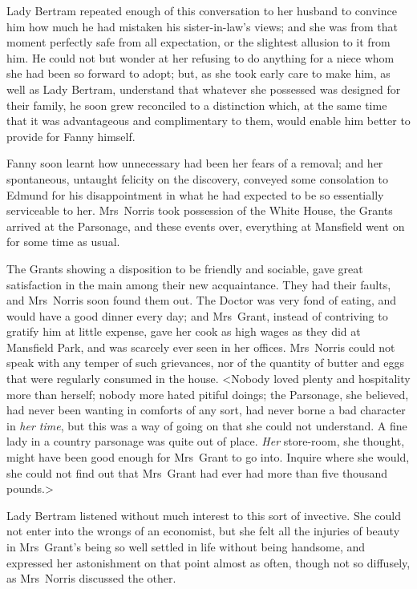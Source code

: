 Lady Bertram repeated enough of this conversation to her husband to convince him how much he had mistaken his sister-in-law's views; and she was from that moment perfectly safe from all expectation, or the slightest allusion to it from him. He could not but wonder at her refusing to do anything for a niece whom she had been so forward to adopt; but, as she took early care to make him, as well as Lady Bertram, understand that whatever she possessed was designed for their family, he soon grew reconciled to a distinction which, at the same time that it was advantageous and complimentary to them, would enable him better to provide for Fanny himself.

Fanny soon learnt how unnecessary had been her fears of a removal; and her spontaneous, untaught felicity on the discovery, conveyed some consolation to Edmund for his disappointment in what he had expected to be so essentially serviceable to her. Mrs~Norris took possession of the White House, the Grants arrived at the Parsonage, and these events over, everything at Mansfield went on for some time as usual.

The Grants showing a disposition to be friendly and sociable, gave great satisfaction in the main among their new acquaintance. They had their faults, and Mrs~Norris soon found them out. The Doctor was very fond of eating, and would have a good dinner every day; and Mrs~Grant, instead of contriving to gratify him at little expense, gave her cook as high wages as they did at Mansfield Park, and was scarcely ever seen in her offices. Mrs~Norris could not speak with any temper of such grievances, nor of the quantity of butter and eggs that were regularly consumed in the house. <Nobody loved plenty and hospitality more than herself; nobody more hated pitiful doings; the Parsonage, she believed, had never been wanting in comforts of any sort, had never borne a bad character in \textit{her time}, but this was a way of going on that she could not understand. A fine lady in a country parsonage was quite out of place. \textit{Her}  store-room, she thought, might have been good enough for Mrs~Grant to go into. Inquire where she would, she could not find out that Mrs~Grant had ever had more than five thousand pounds.>

Lady Bertram listened without much interest to this sort of invective. She could not enter into the wrongs of an economist, but she felt all the injuries of beauty in Mrs~Grant's being so well settled in life without being handsome, and expressed her astonishment on that point almost as often, though not so diffusely, as Mrs~Norris discussed the other.

